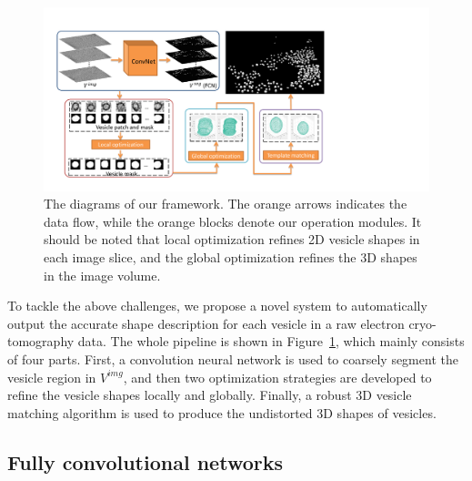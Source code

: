 \begin{figure}
    \begin{center}
        \includegraphics[width=6.7in]{figs/fig_pipline.pdf}
    \end{center}
    \caption{The diagrams of our framework. The orange arrows indicates the data flow, while the orange blocks denote our operation modules. It should be noted that local optimization refines 2D vesicle shapes in each image slice, and the global optimization refines the 3D shapes in the image volume.}
    \label{fig:pl}
\end{figure}

To tackle the above challenges, we propose a novel system to automatically output the accurate shape description for each vesicle in a raw electron cryo-tomography data.
The whole pipeline is shown in Figure~\ref{fig:pl}, which mainly consists of four parts.
First, a convolution neural network is used to coarsely segment the vesicle region in $V^{img}$, and then two optimization strategies are developed to refine the vesicle shapes locally and globally.
Finally, a robust 3D vesicle matching algorithm is used to produce the undistorted 3D shapes of vesicles.

\subsection{Fully convolutional networks}

